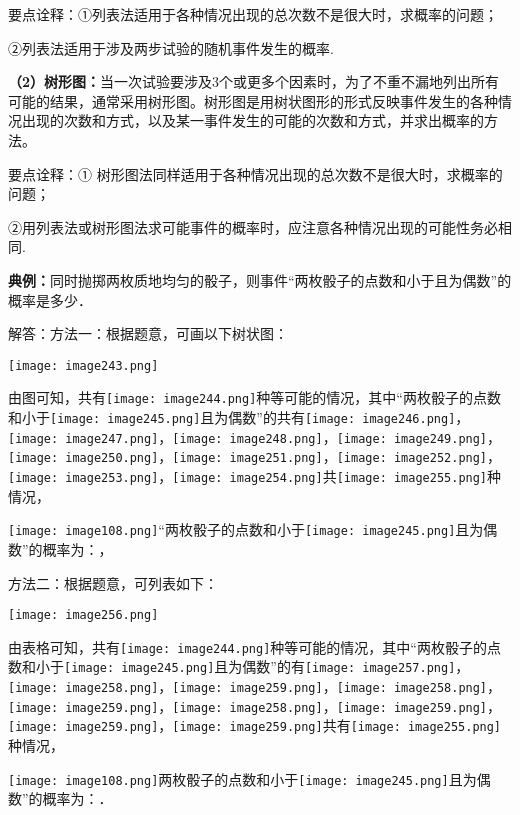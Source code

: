 要点诠释：①列表法适用于各种情况出现的总次数不是很大时，求概率的问题；

②列表法适用于涉及两步试验的随机事件发生的概率.

\textbf{（2）树形图：}当一次试验要涉及3个或更多个因素时，为了不重不漏地列出所有可能的结果，通常采用树形图。树形图是用树状图形的形式反映事件发生的各种情况出现的次数和方式，以及某一事件发生的可能的次数和方式，并求出概率的方法。

要点诠释：①
树形图法同样适用于各种情况出现的总次数不是很大时，求概率的问题；

②用列表法或树形图法求可能事件的概率时，应注意各种情况出现的可能性务必相同.

\textbf{典例：}同时抛掷两枚质地均匀的骰子，则事件``两枚骰子的点数和小于且为偶数''的概率是多少．

解答：方法一：根据题意，可画以下树状图：

\texttt{[image: image243.png]}

由图可知，共有\texttt{[image: image244.png]}种等可能的情况，其中``两枚骰子的点数和小于\texttt{[image: image245.png]}且为偶数''的共有\texttt{[image: image246.png]}，\texttt{[image: image247.png]}，\texttt{[image: image248.png]}，\texttt{[image: image249.png]}，\texttt{[image: image250.png]}，\texttt{[image: image251.png]}，\texttt{[image: image252.png]}，\texttt{[image: image253.png]}，\texttt{[image: image254.png]}共\texttt{[image: image255.png]}种情况，

\texttt{[image: image108.png]}``两枚骰子的点数和小于\texttt{[image: image245.png]}且为偶数''的概率为：，

方法二：根据题意，可列表如下：

\texttt{[image: image256.png]}

由表格可知，共有\texttt{[image: image244.png]}种等可能的情况，其中``两枚骰子的点数和小于\texttt{[image: image245.png]}且为偶数''的有\texttt{[image: image257.png]}，\texttt{[image: image258.png]}，\texttt{[image: image259.png]}，\texttt{[image: image258.png]}，\texttt{[image: image259.png]}，\texttt{[image: image258.png]}，\texttt{[image: image259.png]}，\texttt{[image: image259.png]}，\texttt{[image: image259.png]}共有\texttt{[image: image255.png]}种情况，

\texttt{[image: image108.png]}两枚骰子的点数和小于\texttt{[image: image245.png]}且为偶数''的概率为：．

